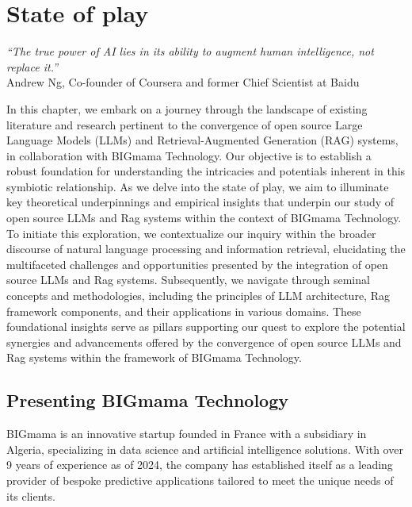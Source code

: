 \chapter{State of play}
\graphicspath{{introduction/figures/}}

\begin{flushright}
    \small{\textit{``The true power of AI lies in its ability to augment human intelligence, not replace it.''}\\
        Andrew Ng, Co-founder of Coursera and former Chief Scientist at Baidu}
\end{flushright}

In this chapter, we embark on a journey through the landscape of existing literature and research pertinent to the convergence of open source Large Language Models (LLMs) and Retrieval-Augmented Generation (RAG) systems, in collaboration with BIGmama Technology. Our objective is to establish a robust foundation for understanding the intricacies and potentials inherent in this symbiotic relationship. As we delve into the state of play, we aim to illuminate key theoretical underpinnings and empirical insights that underpin our study of open source LLMs and Rag systems within the context of BIGmama Technology. To initiate this exploration, we contextualize our inquiry within the broader discourse of natural language processing and information retrieval, elucidating the multifaceted challenges and opportunities presented by the integration of open source LLMs and Rag systems. Subsequently, we navigate through seminal concepts and methodologies, including the principles of LLM architecture, Rag framework components, and their applications in various domains. These foundational insights serve as pillars supporting our quest to explore the potential synergies and advancements offered by the convergence of open source LLMs and Rag systems within the framework of BIGmama Technology.

\section{Presenting BIGmama Technology}

BIGmama is an innovative startup founded in France with a subsidiary in Algeria, specializing in data science and artificial intelligence solutions. With over 9 years of experience as of 2024, the company has established itself as a leading provider of bespoke predictive applications tailored to meet the unique needs of its clients.

